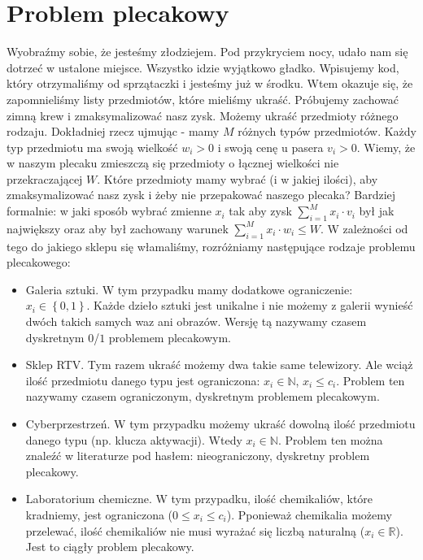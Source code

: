 \section{Problem plecakowy}

\label{sec:plecaki}

Wyobraźmy sobie, że jesteśmy złodziejem.
Pod przykryciem nocy, udało nam się dotrzeć w ustalone miejsce.
Wszystko idzie wyjątkowo gładko.
Wpisujemy kod, który otrzymaliśmy od sprzątaczki i jesteśmy już w środku.
Wtem okazuje się, że zapomnieliśmy listy przedmiotów, które mieliśmy ukraść.
Próbujemy zachować zimną krew i zmaksymalizować nasz zysk.
Możemy ukraść przedmioty różnego rodzaju.
Dokładniej rzecz ujmując - mamy $M$ różnych typów przedmiotów.
Każdy typ przedmiotu ma swoją wielkość $w_i > 0$ i swoją cenę u pasera $v_i > 0$.
Wiemy, że w naszym plecaku zmieszczą się przedmioty o łącznej wielkości nie przekraczającej $W$.
Które przedmioty mamy wybrać (i w jakiej ilości), aby zmaksymalizować nasz zysk i żeby nie przepakować naszego plecaka?
Bardziej formalnie: w jaki sposób wybrać zmienne $x_i$ tak aby zysk $\sum_{i=1}^{M} x_i \cdot v_i$ był jak największy oraz aby był
zachowany warunek $\sum_{i=1}^{M} x_i \cdot w_i \leq W$.
W zależności od tego do jakiego sklepu się włamaliśmy, rozróżniamy następujące rodzaje problemu plecakowego:
\begin{itemize}
  \item Galeria sztuki.
  W tym przypadku mamy dodatkowe ograniczenie: $x_i \in \left \{ 0, 1 \right \}$.
  Każde dzieło sztuki jest unikalne i nie możemy z galerii wynieść dwóch takich samych waz ani obrazów.
  Wersję tą nazywamy czasem dyskretnym $0$/$1$ problemem plecakowym.
  \item Sklep RTV.
  Tym razem ukraść możemy dwa takie same telewizory.
  Ale wciąż ilość przedmiotu danego typu jest ograniczona: $x_i \in \mathbb{N}$, $x_i \leq c_i$.
  Problem ten nazywamy czasem ograniczonym, dyskretnym problemem plecakowym.
  \item Cyberprzestrzeń.
  W tym przypadku możemy ukraść dowolną ilość przedmiotu danego typu (np. klucza aktywacji).
  Wtedy $x_i \in \mathbb{N}$.
  Problem ten można znaleźć w literaturze pod hasłem: nieograniczony, dyskretny problem plecakowy.
  \item Laboratorium chemiczne.
  W tym przypadku, ilość chemikaliów, które kradniemy, jest ograniczona ($0 \leq x_i \leq c_i$).
  Pponieważ chemikalia możemy przelewać, ilość chemikaliów nie musi wyrażać się liczbą naturalną ($x_i \in \mathbb{R}$).
  Jest to ciągły problem plecakowy.
\end{itemize}

